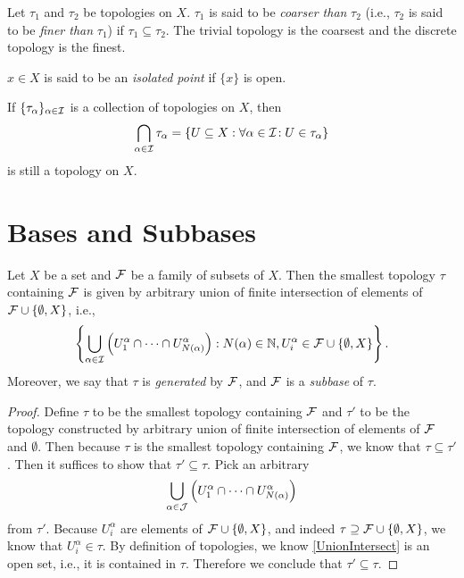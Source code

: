 \documentclass{techreport}
\begin{document}
\begin{definition}\label{De:TopComparison}
	Let $\tau_1$ and $\tau_2$ be topologies on $X$.
	$\tau_1$ is said to be \emph{coarser than} $\tau_2$ (i.e., $\tau_2$ is said to be \emph{finer than} $\tau_1$) if $\tau_1 \subseteq \tau_2$.
	The trivial topology is the coarsest and the discrete topology is the finest.
\end{definition}

\begin{definition}\label{De:IsolatedPoint}
	$x \in X$ is said to be an \emph{isolated point} if $\{x\}$ is open.
\end{definition}

\begin{remark}\label{Rem:IntersectTopStillTop}
	If $\{ \tau_\alpha \}_{\alpha \in \mathcal{I}}$ is a collection of topologies on $X$, then
	\begin{equation*}
		\bigcap_{\alpha \in \mathcal{I}} \tau_\alpha = \left\{ { U \subseteq X : \forall {\alpha \in \mathcal{I}}\!: U \in \tau_\alpha } \right\}
	\end{equation*}
	is still a topology on $X$.
\end{remark}

\section{Bases and Subbases}

\begin{proposition}\label{Prop:Subbase}
	Let $X$ be a set and $\mathcal{F}$ be a family of subsets of $X$.
	Then the smallest topology $\tau$ containing $\mathcal{F}$ is given by arbitrary union of finite intersection of elements of $\mathcal{F} \cup \{\emptyset,X\}$, i.e.,
	\begin{equation*}
		\left\{ { \bigcup_{\alpha \in \mathcal{I}} \left({U_1^\alpha \cap \cdots \cap U_{N(\alpha)}^\alpha}\right) : N(\alpha) \in \mathbb{N}, U_i^\alpha \in \mathcal{F} \cup \{ \emptyset, X \} } \right\}.
	\end{equation*}
	Moreover, we say that $\tau$ is \emph{generated} by $\mathcal{F}$, and $\mathcal{F}$ is a \emph{subbase} of $\tau$.
\end{proposition}
\begin{proof}
	Define $\tau$ to be the smallest topology containing $\mathcal{F}$ and $\tau'$ to be the topology constructed by arbitrary union of finite intersection of elements of $\mathcal{F}$ and $\emptyset$.
	Then because $\tau$ is the smallest topology containing $\mathcal{F}$, we know that $\tau \subseteq \tau'$.
	Then it suffices to show that $\tau' \subseteq \tau$.
	Pick an arbitrary
	\begin{equation}\label{Eq:UnionIntersect}
	\bigcup_{\alpha \in \mathcal{J}} \left({ U_1^\alpha \cap \cdots \cap U_{N(\alpha)}^\alpha }\right)
	\end{equation}
	from $\tau'$.
	Because $U_i^\alpha$ are elements of $\mathcal{F} \cup \{ \emptyset,X\}$, and indeed $\tau \supseteq \mathcal{F} \cup \{ \emptyset,X\}$, we know that $U_i^\alpha \in \tau$.
	By definition of topologies, we know \eqref{UnionIntersect} is an open set, i.e., it is contained in $\tau$.
	Therefore we conclude that $\tau' \subseteq \tau$.
\end{proof}
\end{document}
